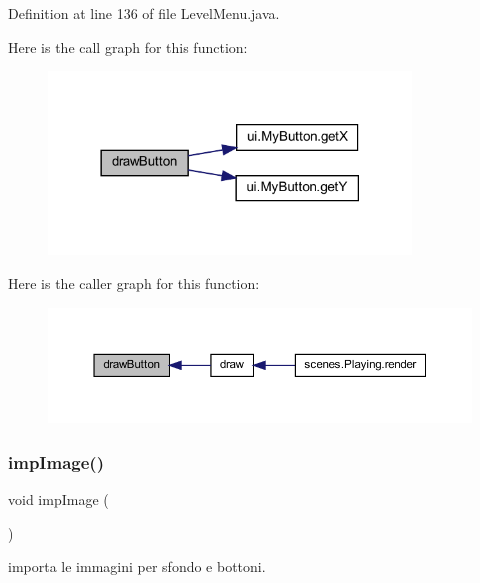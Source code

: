 Definition at line 136 of file Level\+Menu.\+java.

Here is the call graph for this function\+:\nopagebreak
\begin{figure}[H]
\begin{center}
\leavevmode
\includegraphics[width=273pt]{classui_1_1_level_menu_a65768678909bc0512c6cb9780709ad38_cgraph}
\end{center}
\end{figure}
Here is the caller graph for this function\+:\nopagebreak
\begin{figure}[H]
\begin{center}
\leavevmode
\includegraphics[width=350pt]{classui_1_1_level_menu_a65768678909bc0512c6cb9780709ad38_icgraph}
\end{center}
\end{figure}
\mbox{\label{classui_1_1_level_menu_aded9c531b53772fd90d09a8b6bf0132e}} 
\subsubsection{\texorpdfstring{imp\+Image()}{impImage()}}
{\footnotesize\ttfamily void imp\+Image (\begin{DoxyParamCaption}{ }\end{DoxyParamCaption})\hspace{0.3cm}{\ttfamily [private]}}



importa le immagini per sfondo e bottoni. 



